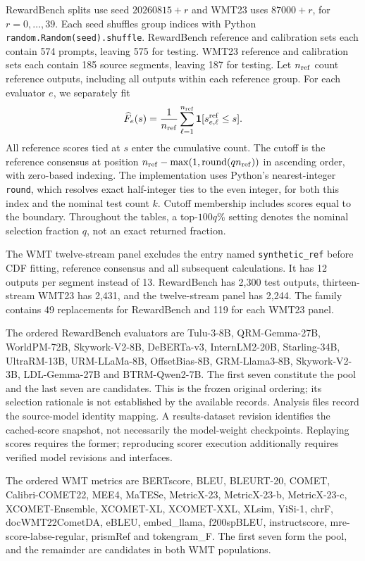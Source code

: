 RewardBench splits use seed $20260815+r$ and WMT23 uses $87000+r$, for $r=0,\ldots,39$. Each seed shuffles group indices with Python \texttt{random.Random(seed).shuffle}. RewardBench reference and calibration sets each contain 574 prompts, leaving 575 for testing. WMT23 reference and calibration sets each contain 185 source segments, leaving 187 for testing. Let $n_{\rm ref}$ count reference outputs, including all outputs within each reference group. For each evaluator $e$, we separately fit
\[
 \widehat F_e(s)=\frac{1}{n_{\rm ref}}\sum_{\ell=1}^{n_{\rm ref}}\mathbf{1}[s^{\rm ref}_{e,\ell}\le s].
\]
All reference scores tied at $s$ enter the cumulative count. The cutoff is the reference consensus at position $n_{\rm ref}-\max(1,\operatorname{round}(qn_{\rm ref}))$ in ascending order, with zero-based indexing. The implementation uses Python's nearest-integer \texttt{round}, which resolves exact half-integer ties to the even integer, for both this index and the nominal test count $k$. Cutoff membership includes scores equal to the boundary. Throughout the tables, a top-$100q$\% setting denotes the nominal selection fraction $q$, not an exact returned fraction.

The WMT twelve-stream panel excludes the entry named \texttt{synthetic\_ref} before CDF fitting, reference consensus and all subsequent calculations. It has 12 outputs per segment instead of 13. RewardBench has 2,300 test outputs, thirteen-stream WMT23 has 2,431, and the twelve-stream panel has 2,244. The family contains 49 replacements for RewardBench and 119 for each WMT23 panel. 

The ordered RewardBench evaluators are Tulu-3-8B, QRM-Gemma-27B, WorldPM-72B, Skywork-V2-8B, DeBERTa-v3, InternLM2-20B, Starling-34B, UltraRM-13B, URM-LLaMa-8B, OffsetBias-8B, GRM-Llama3-8B, Skywork-V2-3B, LDL-Gemma-27B and BTRM-Qwen2-7B. The first seven constitute the pool and the last seven are candidates. This is the frozen original ordering; its selection rationale is not established by the available records. Analysis files record the source-model identity mapping. A results-dataset revision identifies the cached-score snapshot, not necessarily the model-weight checkpoints. Replaying scores requires the former; reproducing scorer execution additionally requires verified model revisions and interfaces.

The ordered WMT metrics are BERTscore, BLEU, BLEURT-20, COMET, Calibri-COMET22, MEE4, MaTESe, MetricX-23, MetricX-23-b, MetricX-23-c, XCOMET-Ensemble, XCOMET-XL, XCOMET-XXL, XLsim, YiSi-1, chrF, docWMT22CometDA, eBLEU, embed\_llama, f200spBLEU, instructscore, mre-score-labse-regular, prismRef and tokengram\_F. The first seven form the pool, and the remainder are candidates in both WMT populations.

